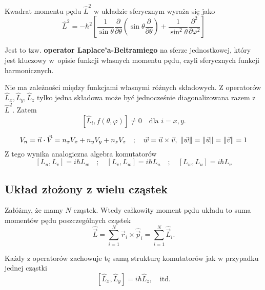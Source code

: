 Kwadrat momentu pędu $\hat{L}^2$ w układzie sferycznym wyraża się jako
$$
\hat{L}^2 = -\hbar^2 \left[ \frac{1}{\sin\theta} \frac{\partial}{\partial\theta} \left( \sin\theta \frac{\partial}{\partial\theta} \right) + \frac{1}{\sin^2\theta} \frac{\partial^2}{\partial\varphi^2} \right]
$$

Jest to tzw. \textbf{operator Laplace’a-Beltramiego} na sferze jednostkowej, który jest kluczowy w~opisie funkcji własnych momentu pędu, czyli sferycznych funkcji harmonicznych.

Nie ma zależności między funkcjami własnymi różnych składowych. Z operatorów $\hat{L}_x, \hat{L}_y, \hat{L}_z$ tylko jedna składowa może być jednocześnie diagonalizowana razem z $\hat{L}^2$. Zatem
$$
[\hat{L}_i, f(\theta, \varphi)] \ne 0 \quad \text{dla } i = x, y.
$$

$$
V_n = \vec{n} \cdot \vec{V} = n_x V_x + n_y V_y + n_z V_z \quad ; \quad \vec{w} = \vec{u} \times \vec{v}, \; \norm{\vec{w}} = \norm{\vec{u}} = \norm{\vec{v}} = 1
$$
Z tego wynika analogiczna algebra komutatorów
$$
[L_u, L_v] = i\hbar L_w \quad ; \quad [L_v, L_w] = i\hbar L_u \quad ; \quad [L_w, L_u] = i\hbar L_v
$$

\subsection{Układ złożony z wielu cząstek}
Załóżmy, że mamy $N$ cząstek. Wtedy całkowity moment pędu układu to suma momentów pędu poszczególnych cząstek
$$
\hat{\vec{L}} = \sum_{i=1}^N \vec{r}_i \times \hat{\vec{p}}_i = \sum_{i=1}^N \hat{\vec{L}}_i.
$$

Każdy z operatorów zachowuje tę samą strukturę komutatorów jak w przypadku jednej cząstki
$$
[\hat{L}_x, \hat{L}_y] = i\hbar \hat{L}_z, \quad \text{itd.}
$$

